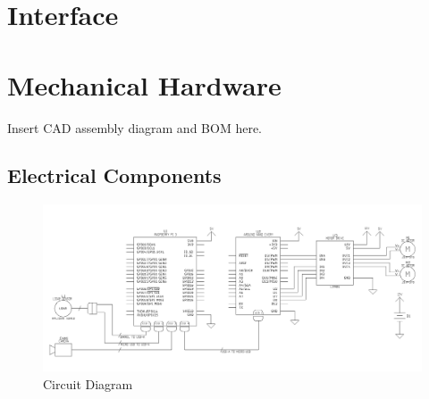 \documentclass[12pt, titlepage]{article}
\begin{document}
\newpage



\newpage{}

\appendix

\section{Interface}
\label{Interface}


\section{Mechanical Hardware}
\label{Mechanical_Hardware}
Insert CAD assembly diagram and BOM here.\\


\begin{landscape}
\section{Electrical Components}
\label{Electrical_Components}

\vspace*{\fill}
\begin{figure}[H]
\begin{center}
 \includegraphics[width=1.25\textwidth]{Figures/Circuit Diagram.pdf}
\caption{Circuit Diagram}
\label{Fig_CircuitDiagram} 
\end{center}
\end{figure}
\vspace*{\fill}
\end{landscape}
\end{document}
